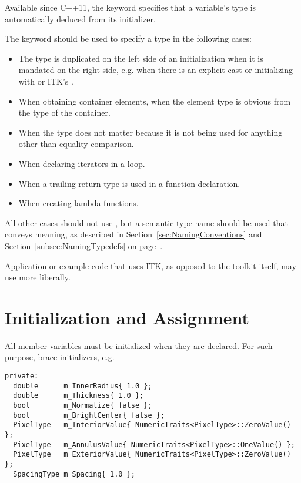Available since C++11, the  keyword specifies that a variable's type
is automatically deduced from its initializer.

The  keyword should be used to specify a type in the following cases:

\begin{itemize}
\item The type is duplicated on the left side of an initialization when it is mandated on the
	right side, e.g. when there is an explicit cast or initializing with  or ITK's .
\item When obtaining container elements, when the element type is obvious from the type
      of the container.
\item When the type does not matter because it is not being used for anything other
      than equality comparison.
\item When declaring iterators in a  loop.
\item When a trailing return type is used in a function declaration.
\item When creating lambda functions.
\end{itemize}

All other cases should not use , but a semantic type name
should be used that conveys meaning, as described in Section~\ref{sec:NamingConventions}
and Section~\ref{subsec:NamingTypedefs} on page~\pageref{subsec:NamingTypedefs}.

Application or example code that uses ITK, as opposed to the toolkit itself,
may use  more liberally.


\section{Initialization and Assignment}
\label{sec:IniitalizationAndAssignment}

All member variables must be initialized when they are declared. For such
purpose, brace initializers, e.g.

\small
\begin{verbatim}
private:
  double      m_InnerRadius{ 1.0 };
  double      m_Thickness{ 1.0 };
  bool        m_Normalize{ false };
  bool        m_BrightCenter{ false };
  PixelType   m_InteriorValue{ NumericTraits<PixelType>::ZeroValue() };
  PixelType   m_AnnulusValue{ NumericTraits<PixelType>::OneValue() };
  PixelType   m_ExteriorValue{ NumericTraits<PixelType>::ZeroValue() };
  SpacingType m_Spacing{ 1.0 };
\end{verbatim}
\normalsize

